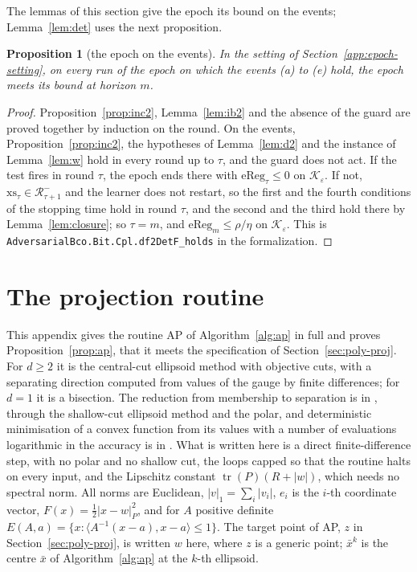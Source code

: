\documentclass[11pt]{amsart}
\newtheorem{proposition}[theorem]{Proposition}
\theoremstyle{definition}
\numberwithin{equation}{section}
\newcommand{\cK}{\mathcal{K}}
\newcommand{\tr}{\operatorname{tr}}
\newcommand{\ip}[1]{\langle #1\rangle}
\begin{document}
The lemmas of this section give the epoch its bound on the events; Lemma~\ref{lem:det} uses the next proposition.

\begin{proposition}[the epoch on the events]\label{prop:epoch}
In the setting of Section~\ref{app:epoch-setting}, on every run of the epoch on which the events (a) to (e) hold, the epoch meets its bound at horizon $m$.
\end{proposition}

\begin{proof}
Proposition~\ref{prop:inc2}, Lemma~\ref{lem:ib2} and the absence of the guard are proved together by induction on the round. On the events, Proposition~\ref{prop:inc2}, the hypotheses of Lemma~\ref{lem:d2} and the instance of Lemma~\ref{lem:w} hold in every round up to $\tau$, and the guard does not act. If the test fires in round $\tau$, the epoch ends there with $\mathrm{eReg}_\tau\le0$ on $\cK_\varepsilon$. If not, $\mathrm{xs}_\tau\in\mathcal R^-_{\tau+1}$ and the learner does not restart, so the first and the fourth conditions of the stopping time hold in round $\tau$, and the second and the third hold there by Lemma~\ref{lem:closure}; so $\tau=m$, and $\mathrm{eReg}_m\le\rho/\eta$ on $\cK_\varepsilon$.
This is \texttt{AdversarialBco.Bit.Cpl.df2DetF\_holds} in the formalization.
\end{proof}

\section{The projection routine}\label{app:ap}

This appendix gives the routine AP of Algorithm~\ref{alg:ap} in full and proves Proposition~\ref{prop:ap}, that it meets the specification of Section~\ref{sec:poly-proj}. For $d\ge2$ it is the central-cut ellipsoid method with objective cuts, with a separating direction computed from values of the gauge by finite differences; for $d=1$ it is a bisection. The reduction from membership to separation is in \cite[Theorems~(4.3.2) and~(4.4.4)]{GLS93}, through the shallow-cut ellipsoid method and the polar, and deterministic minimisation of a convex function from its values with a number of evaluations logarithmic in the accuracy is in \cite[Section~5]{Pro96}. What is written here is a direct finite-difference step, with no polar and no shallow cut, the loops capped so that the routine halts on every input, and the Lipschitz constant $\tr(P)(R+|w|)$, which needs no spectral norm. All norms are Euclidean, $|v|_1=\sum_i|v_i|$, $e_i$ is the $i$-th coordinate vector, $F(x)=\frac12|x-w|^2_P$, and for $A$ positive definite $E(A,a)=\{x:\ip{A^{-1}(x-a),x-a}\le1\}$. The target point of AP, $z$ in Section~\ref{sec:poly-proj}, is written $w$ here, where $z$ is a generic point; $\bar x^k$ is the centre $\bar x$ of Algorithm~\ref{alg:ap} at the $k$-th ellipsoid.
\end{document}
